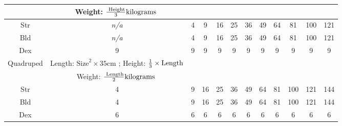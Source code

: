 \documentclass[twoside]{book}
\begin{document}
\begin{table}[htb]
\begin{center}
\begin{tabular}{|c|c|c|c|c|c|c|c|c|c|c|c|}
\hline

& Weight: \begin{math}    {{\textrm{
                     Height}}\over{ 3 }}  \textrm{kilograms
                    }    \end{math}
                  \\

\hline

 Str &
                    \textit{n/a}
                  & 4 & 9 & 16 & 25 & 36 & 49 & 64 & 81 & 100 & 121 \\

\hline

 Bld &
                    \textit{n/a}
                  & 4 & 9 & 16 & 25 & 36 & 49 & 64 & 81 & 100 & 121 \\

\hline

 Dex & 9 & 9 & 9 & 9 & 9 & 9 & 9 & 9 & 9 & 9 & 9 \\

\hline

 Quadruped &  Length: \begin{math}  
                        {\textrm{Size}}^{ 2 }   \times     35 \textrm{
                           cm}  \end{math} ; Height: \begin{math} 
                           {{ 1 }\over{ 3 }}  
                           \times    \textrm{Length}  \end{math}
                  \\

\hline

&  Weight: \begin{math}    {{\textrm{
                     Length}}\over{ 2 }}  \textrm{kilograms
                    }    \end{math}
                  \\

\hline

 Str & 4 & 9 & 16 & 25 & 36 & 49 & 64 & 81 & 100 & 121 & 144 \\

\hline

 Bld & 4 & 9 & 16 & 25 & 36 & 49 & 64 & 81 & 100 & 121 & 144 \\

\hline

 Dex & 6 & 6 & 6 & 6 & 6 & 6 & 6 & 6 & 6 & 6 & 6 \\

\hline


\end{tabular}
\end{center}
\end{table}
\end{document}
